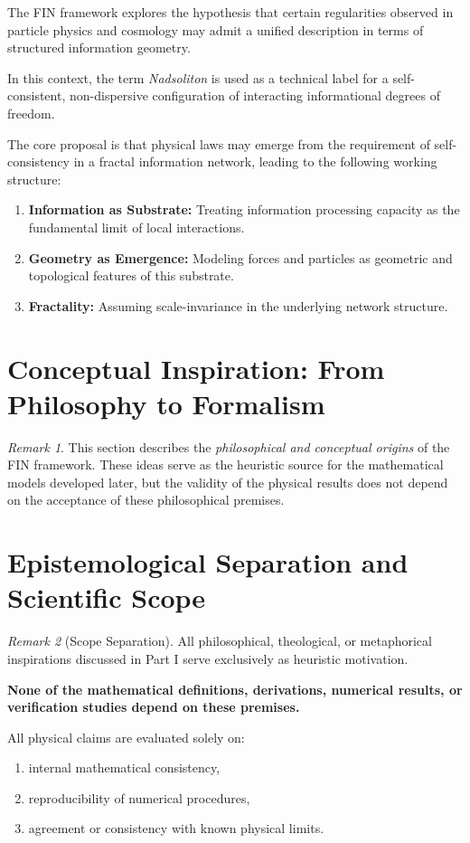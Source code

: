 \documentclass[11pt,a4paper]{book}
\theoremstyle{remark}
\newtheorem{remark}{Remark}[section]
\begin{document}
The FIN framework explores the hypothesis that certain regularities observed in particle physics and cosmology may admit a unified description in terms of structured information geometry.

In this context, the term \textit{Nadsoliton} is used as a technical label for a self-consistent, non-dispersive configuration of interacting informational degrees of freedom.

The core proposal is that physical laws may emerge from the requirement of self-consistency in a fractal information network, leading to the following working structure:

\begin{enumerate}
    \item \textbf{Information as Substrate:} Treating information processing capacity as the fundamental limit of local interactions.
    \item \textbf{Geometry as Emergence:} Modeling forces and particles as geometric and topological features of this substrate.
    \item \textbf{Fractality:} Assuming scale-invariance in the underlying network structure.
\end{enumerate}

\section{Conceptual Inspiration: From Philosophy to Formalism}

\begin{remark}
This section describes the \textit{philosophical and conceptual origins} of the FIN framework. These ideas serve as the heuristic source for the mathematical models developed later, but the validity of the physical results does not depend on the acceptance of these philosophical premises.
\end{remark}

\section{Epistemological Separation and Scientific Scope}

\begin{remark}[Scope Separation]
All philosophical, theological, or metaphorical inspirations discussed in Part I serve exclusively as heuristic motivation.

\textbf{None of the mathematical definitions, derivations, numerical results, or verification studies depend on these premises.}

All physical claims are evaluated solely on:
\begin{enumerate}
    \item internal mathematical consistency,
    \item reproducibility of numerical procedures,
    \item agreement or consistency with known physical limits.
\end{enumerate}
\end{remark}
\end{document}
